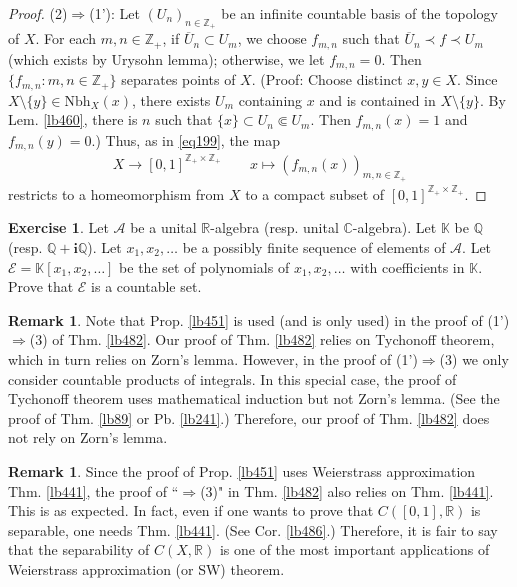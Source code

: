 \documentclass[12pt,b5paper,notitlepage]{article}
\theoremstyle{definition}
\newtheorem{exe}[df]{Exercise}
\newtheorem{rem}[df]{Remark}
\theoremstyle{plain}
\newcommand{\mc}{\mathcal}
\newcommand{\ovl}{\overline}
\newcommand{\scr}{\mathscr}
\newcommand{\im}{\mathbf{i}}
\newcommand{\Kbb}{\mathbb K}
\newcommand{\Cbb}{\mathbb C}
\newcommand{\Zbb}{\mathbb Z}
\newcommand{\Qbb}{\mathbb Q}
\newcommand{\Rbb}{\mathbb R}
\newcommand{\Nbh}{\mathrm{Nbh}}
\numberwithin{equation}{section}
\begin{document}
\begin{proof}
(2)$\Rightarrow$(1'): Let $(U_n)_{n\in\Zbb_+}$ be an infinite countable basis of the topology of $X$. For each $m,n\in\Zbb_+$, if $\ovl U_n\subset U_m$, we choose $f_{m,n}$ such that $\ovl U_n\prec f\prec U_m$ (which exists by Urysohn lemma); otherwise, we let $f_{m,n}=0$. Then $\{f_{m,n}:m,n\in\Zbb_+\}$ separates points of $X$. (Proof: Choose distinct $x,y\in X$. Since $X\setminus\{y\}\in\Nbh_X(x)$, there exists $U_m$ containing $x$ and is contained in $X\setminus\{y\}$. By Lem. \ref{lb460}, there is $n$ such that $\{x\}\subset U_n\Subset U_m$. Then $f_{m,n}(x)=1$ and $f_{m,n}(y)=0$.) Thus, as in \eqref{eq199}, the map
\begin{align*}
X\rightarrow[0,1]^{\Zbb_+\times\Zbb_+}\qquad x\mapsto (f_{m,n}(x))_{m,n\in\Zbb_+}
\end{align*}
restricts to a homeomorphism from $X$ to a compact subset of $[0,1]^{\Zbb_+\times\Zbb_+}$.
\end{proof}





\begin{exe}\label{lb476}
Let $\scr A$ be a unital $\Rbb$-algebra (resp. unital $\Cbb$-algebra). Let $\Kbb$ be $\Qbb$ (resp. $\Qbb+\im\Qbb$). Let $x_1,x_2,\dots$ be a possibly finite sequence of elements of $\scr A$. Let $\mc E=\Kbb[x_1,x_2,\dots]$ be the set of polynomials of $x_1,x_2,\dots$ with coefficients in $\Kbb$. Prove that $\mc E$ is a countable set.
\end{exe}




\begin{rem}
Note that Prop. \ref{lb451} is used (and is only used) in the proof of (1')$\Rightarrow$(3) of Thm. \ref{lb482}. Our proof of Thm. \ref{lb482} relies on Tychonoff theorem, which in turn relies on Zorn's lemma. However, in the proof of (1')$\Rightarrow$(3) we only consider countable products of integrals. In this special case, the proof of Tychonoff theorem uses mathematical induction but not Zorn's lemma. (See the proof of Thm. \ref{lb89} or Pb. \ref{lb241}.) Therefore, our proof of Thm. \ref{lb482} does not rely on Zorn's lemma.
\end{rem}

\begin{rem}
Since the proof of Prop. \ref{lb451} uses Weierstrass approximation Thm. \ref{lb441}, the proof of ``$\Rightarrow$(3)" in Thm. \ref{lb482} also relies on Thm. \ref{lb441}. This is as expected. In fact, even if one wants to prove that $C([0,1],\Rbb)$ is separable, one needs Thm. \ref{lb441}. (See Cor. \ref{lb486}.) Therefore, it is fair to say that the separability of $C(X,\Rbb)$ is one of the most important applications of Weierstrass approximation (or SW) theorem.
\end{rem}
\end{document}
